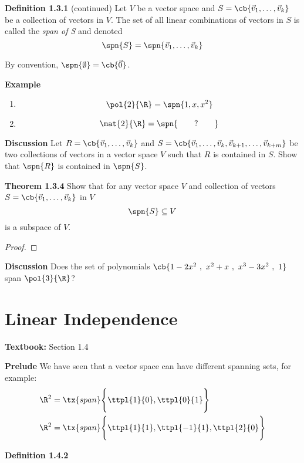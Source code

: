 \documentclass[letterpaper, 10pt]{article}
\begin{document}
\lb
\textbf{Definition 1.3.1} (continued)
\lb
Let $V$ be a vector space and $S = \cb{\vec v_1, \ldots, \vec v_k}$ be a collection of vectors
in $V$. The set of all linear combinations of vectors in $S$ is called the \emph{span of S}
and denoted
\[ \spn{S} = \spn{\vec v_1, \ldots, \vec v_k} \]

\pr
By convention, $\spn{\emptyset} = \cb{\vec 0}$.


\lb
\textbf{Example}
\lb
\begin{enumerate}
    \item \[ \pol{2}{\R} = \spn{1, x, x^2} \]
    \item \[ \mat{2}{\R} = \spn{\qquad ? \qquad } \]
\end{enumerate}


\newpage
\lb
\textbf{Discussion}
\lb
Let $R = \cb{\vec v_1, \ldots, \vec v_k}$ and
$S = \cb{\vec v_1, \ldots, \vec v_k, \vec v_{k+1}, \ldots, \vec v_{k+m}}$ be two collections
of vectors in a vector space $V$ such that $R$ is contained in $S$.
Show that $\spn{R}$ is contained in $\spn{S}$.


\vspace{300pt}


\lb
\textbf{Theorem 1.3.4}
\lb
Show that for any vector space $V$ and collection of vectors
$S = \cb{\vec v_1, \ldots, \vec v_k}$ in $V$
\[ \spn{S} \subseteq V\] is a subspace of $V$.
\begin{proof}
    
\end{proof}











\newpage
\lb
\textbf{Discussion}
\lb
Does the set of polynomials $ \cb{1-2x^2~,~ x^2 + x ~,~ x^3 - 3x^2 ~,~ 1}$ span $\pol{3}{\R}$?





\newpage
\section*{Linear Independence}%
\label{sec:Linear Independence}

\textbf{Textbook:} Section 1.4

\lb
\textbf{Prelude}
\lb
We have seen that a vector space can have different spanning sets, for example:
\begin{align*}
    \R^2 &= \tx{span} \Bigg \{ \ttpl{1}{0}, \ttpl{0}{1} \Bigg \} \\
    \R^2 &= \tx{span} \Bigg \{ \ttpl{1}{1}, \ttpl{-1}{1}, \ttpl{2}{0} \Bigg \}
\end{align*}
\lb
\lb
\lb
\lb
\lb
\lb
{}



\lb
\textbf{Definition 1.4.2}
\lb
\end{document}
